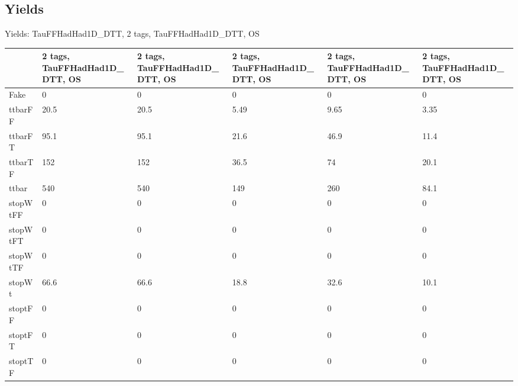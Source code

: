 
\subsection{Yields}

\begin{frame}{Yields: TauFFHadHad1D\_DTT, 2 tags, TauFFHadHad1D\_DTT, OS}
\begin{center}
  \begin{tabular}{l| >{\centering\let\newline\\\arraybackslash\hspace{0pt}}m{1.4cm}| >{\centering\let\newline\\\arraybackslash\hspace{0pt}}m{1.4cm}| >{\centering\let\newline\\\arraybackslash\hspace{0pt}}m{1.4cm}| >{\centering\let\newline\\\arraybackslash\hspace{0pt}}m{1.4cm}| >{\centering\let\newline\\\arraybackslash\hspace{0pt}}m{1.4cm}}
    & 2 tags, TauFFHadHad1D\_DTT, OS & 2 tags, TauFFHadHad1D\_DTT, OS & 2 tags, TauFFHadHad1D\_DTT, OS & 2 tags, TauFFHadHad1D\_DTT, OS & 2 tags, TauFFHadHad1D\_DTT, OS \\
 \hline \hline
    Fake& 0 & 0 & 0 & 0 & 0 \\
 \hline
    ttbarFF& 20.5 & 20.5 & 5.49 & 9.65 & 3.35 \\
 \hline
    ttbarFT& 95.1 & 95.1 & 21.6 & 46.9 & 11.4 \\
 \hline
    ttbarTF& 152 & 152 & 36.5 & 74 & 20.1 \\
 \hline
    ttbar& 540 & 540 & 149 & 260 & 84.1 \\
 \hline
    stopWtFF& 0 & 0 & 0 & 0 & 0 \\
 \hline
    stopWtFT& 0 & 0 & 0 & 0 & 0 \\
 \hline
    stopWtTF& 0 & 0 & 0 & 0 & 0 \\
 \hline
    stopWt& 66.6 & 66.6 & 18.8 & 32.6 & 10.1 \\
 \hline
    stoptFF& 0 & 0 & 0 & 0 & 0 \\
 \hline
    stoptFT& 0 & 0 & 0 & 0 & 0 \\
 \hline
    stoptTF& 0 & 0 & 0 & 0 & 0 \\

\end{tabular}
\end{center}
\end{frame}
